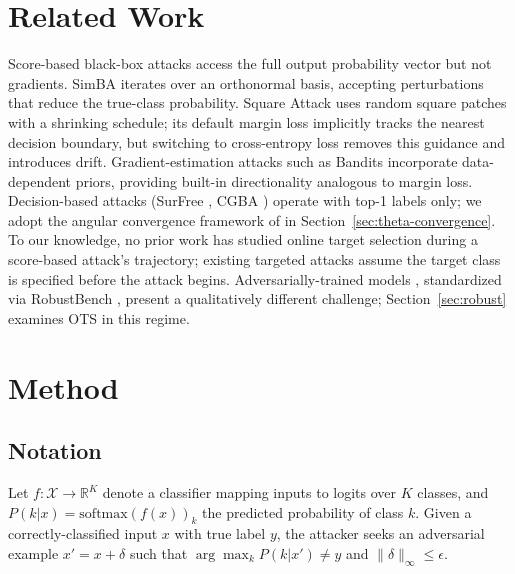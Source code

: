 \documentclass{cap2026}
\begin{document}
\section{Related Work}\label{sec:related-work}

Score-based black-box attacks access the full output probability vector but not gradients. SimBA \citep{guo2019simple} iterates over an orthonormal basis, accepting perturbations that reduce the true-class probability. Square Attack \citep{andriushchenko2020square} uses random square patches with a shrinking schedule; its default margin loss implicitly tracks the nearest decision boundary, but switching to cross-entropy loss removes this guidance and introduces drift. Gradient-estimation attacks such as Bandits \citep{ilyas2019prior} incorporate data-dependent priors, providing built-in directionality analogous to margin loss. Decision-based attacks (SurFree \citep{maho2021surfree}, CGBA \citep{gesny2024gradient}) operate with top-1 labels only; we adopt the angular convergence framework of \citet{gesny2024gradient} in Section~\ref{sec:theta-convergence}. To our knowledge, no prior work has studied online target selection during a score-based attack's trajectory; existing targeted attacks assume the target class is specified before the attack begins. Adversarially-trained models \citep{madry2018towards,salman2020adversarially}, standardized via RobustBench \citep{croce2021robustbench}, present a qualitatively different challenge; Section~\ref{sec:robust} examines OTS in this regime.

\section{Method}\label{sec:method}

\subsection{Notation}\label{sec:notation}

Let $f: \mathcal{X} \to \mathbb{R}^K$ denote a classifier mapping inputs to logits over $K$ classes, and $P(k|x) = \text{softmax}(f(x))_k$ the predicted probability of class $k$. Given a correctly-classified input $x$ with true label $y$, the attacker seeks an adversarial example $x' = x + \delta$ such that $\arg\max_k P(k|x') \neq y$ and $\|\delta\|_\infty \leq \epsilon$.
\end{document}
